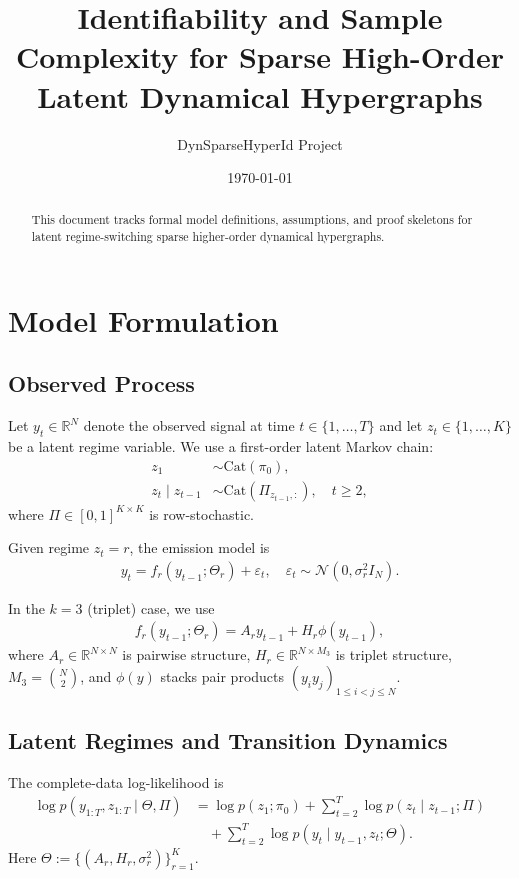 \documentclass[11pt]{article}
\title{Identifiability and Sample Complexity for Sparse High-Order\\Latent Dynamical Hypergraphs}
\author{DynSparseHyperId Project}
\date{\today}
\begin{document}
\maketitle

\begin{abstract}
This document tracks formal model definitions, assumptions, and proof skeletons
for latent regime-switching sparse higher-order dynamical hypergraphs.
\end{abstract}

\section{Model Formulation}
\subsection{Observed Process}
Let $y_t \in \mathbb{R}^N$ denote the observed signal at time $t \in \{1,\dots,T\}$ and
let $z_t \in \{1,\dots,K\}$ be a latent regime variable.
We use a first-order latent Markov chain:
\begin{align}
    z_1 &\sim \text{Cat}(\pi_0), \\
    z_t \mid z_{t-1} &\sim \text{Cat}(\Pi_{z_{t-1},:}), \quad t \ge 2,
\end{align}
where $\Pi \in [0,1]^{K \times K}$ is row-stochastic.

Given regime $z_t=r$, the emission model is
\begin{align}
    y_t = f_r(y_{t-1};\Theta_r) + \varepsilon_t, \quad
    \varepsilon_t \sim \mathcal{N}(0,\sigma_r^2 I_N).
\end{align}

In the $k=3$ (triplet) case, we use
\begin{align}
    f_r(y_{t-1};\Theta_r)
    = A_r y_{t-1} + H_r \phi(y_{t-1}),
\end{align}
where $A_r \in \mathbb{R}^{N \times N}$ is pairwise structure,
$H_r \in \mathbb{R}^{N \times M_3}$ is triplet structure,
$M_3 = \binom{N}{2}$, and $\phi(y)$ stacks pair products
$(y_i y_j)_{1 \le i < j \le N}$.

\subsection{Latent Regimes and Transition Dynamics}
The complete-data log-likelihood is
\begin{align}
    \log p(y_{1:T},z_{1:T}\mid \Theta,\Pi)
    &=
    \log p(z_1;\pi_0)
    + \sum_{t=2}^T \log p(z_t\mid z_{t-1};\Pi) \\
    &\quad + \sum_{t=2}^T \log p(y_t\mid y_{t-1},z_t;\Theta).
\end{align}
Here $\Theta := \{(A_r,H_r,\sigma_r^2)\}_{r=1}^K$.
\end{document}
